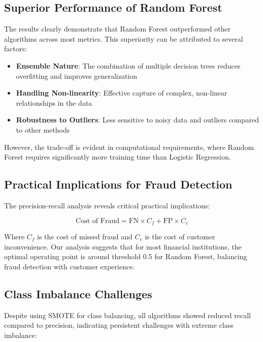 \subsection{Superior Performance of Random Forest}

The results clearly demonstrate that Random Forest outperformed other algorithms across most metrics. This superiority can be attributed to several factors:

\begin{itemize}
\item \textbf{Ensemble Nature}: The combination of multiple decision trees reduces overfitting and improves generalization
\item \textbf{Handling Non-linearity}: Effective capture of complex, non-linear relationships in the data
\item \textbf{Robustness to Outliers}: Less sensitive to noisy data and outliers compared to other methods
\end{itemize}

However, the trade-off is evident in computational requirements, where Random Forest requires significantly more training time than Logistic Regression.

\subsection{Practical Implications for Fraud Detection}

The precision-recall analysis reveals critical practical implications:

\begin{equation}
\text{Cost of Fraud} = \text{FN} \times C_f + \text{FP} \times C_c
\end{equation}

Where \(C_f\) is the cost of missed fraud and \(C_c\) is the cost of customer inconvenience. Our analysis suggests that for most financial institutions, the optimal operating point is around threshold 0.5 for Random Forest, balancing fraud detection with customer experience.

\subsection{Class Imbalance Challenges}

Despite using SMOTE for class balancing, all algorithms showed reduced recall compared to precision, indicating persistent challenges with extreme class imbalance:

